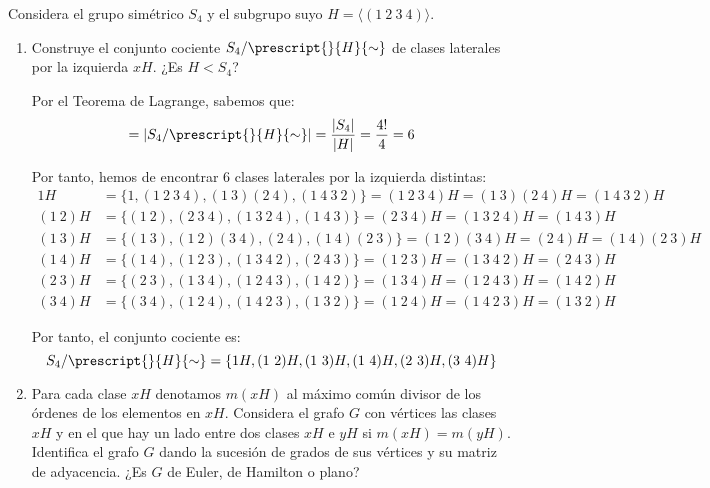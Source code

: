\begin{ejercicio}\label{ej:1.39}
    Considera el grupo simétrico $S_4$ y el subgrupo suyo $H = \langle (1\ 2\ 3\ 4) \rangle$.
    \begin{enumerate}
        \item Construye el conjunto cociente $S_4/\prescript{}{H}{\sim}$ de clases laterales por la izquierda $xH$. ¿Es $H < S_4$?
        
        Por el Teorema de Lagrange, sabemos que:
        \begin{equation*}
            [S_4:H]=\left|S_4/\prescript{}{H}{\sim}\right|=\frac{|S_4|}{|H|}=\frac{4!}{4}=6
        \end{equation*}

        Por tanto, hemos de encontrar 6 clases laterales por la izquierda distintas:
        \begin{align*}
            1H &= \{1, (1\ 2\ 3\ 4), (1\ 3)(2\ 4), (1\ 4\ 3\ 2)\} = (1\ 2\ 3\ 4)H = (1\ 3)(2\ 4)H = (1\ 4\ 3\ 2)H\\
            (1\ 2)H &= \{(1\ 2), (2\ 3\ 4), (1\ 3\ 2\ 4), (1\ 4\ 3)\} = (2\ 3\ 4)H = (1\ 3\ 2\ 4)H = (1\ 4\ 3)H\\
            (1\ 3)H &= \{(1\ 3), (1\ 2)(3\ 4), (2\ 4), (1\ 4)(2\ 3)\} = (1\ 2)(3\ 4)H = (2\ 4)H = (1\ 4)(2\ 3)H\\
            (1\ 4)H &= \{(1\ 4), (1\ 2\ 3), (1\ 3\ 4\ 2), (2\ 4\ 3)\} = (1\ 2\ 3)H = (1\ 3\ 4\ 2)H = (2\ 4\ 3)H\\
            (2\ 3)H &= \{(2\ 3), (1\ 3\ 4), (1\ 2\ 4\ 3), (1\ 4\ 2)\} = (1\ 3\ 4)H = (1\ 2\ 4\ 3)H = (1\ 4\ 2)H\\
            (3\ 4)H &= \{(3\ 4), (1\ 2\ 4), (1\ 4\ 2\ 3), (1\ 3\ 2)\} = (1\ 2\ 4)H = (1\ 4\ 2\ 3)H = (1\ 3\ 2)H
        \end{align*}

        Por tanto, el conjunto cociente es:
        \begin{equation*}
            S_4/\prescript{}{H}{\sim}=\{1H, (1\ 2)H, (1\ 3)H, (1\ 4)H, (2\ 3)H, (3\ 4)H\}
        \end{equation*}
        \item Para cada clase $xH$ denotamos $m(xH)$ al máximo común divisor de los órdenes de los elementos en $xH$. Considera el grafo $G$ con vértices las clases $xH$ y en el que hay un lado entre dos clases $xH$ e $yH$ si $m(xH) = m(yH)$. Identifica el grafo $G$ dando la sucesión de grados de sus vértices y su matriz de adyacencia. ¿Es $G$ de Euler, de Hamilton o plano?
        

\end{enumerate}
\end{ejercicio}
